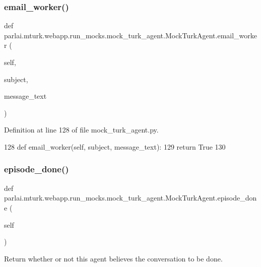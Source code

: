 \subsubsection{\texorpdfstring{email\+\_\+worker()}{email\_worker()}}
{\footnotesize\ttfamily def parlai.\+mturk.\+webapp.\+run\+\_\+mocks.\+mock\+\_\+turk\+\_\+agent.\+Mock\+Turk\+Agent.\+email\+\_\+worker (\begin{DoxyParamCaption}\item[{}]{self,  }\item[{}]{subject,  }\item[{}]{message\+\_\+text }\end{DoxyParamCaption})}



Definition at line 128 of file mock\+\_\+turk\+\_\+agent.\+py.


\begin{DoxyCode}
128     \textcolor{keyword}{def }email\_worker(self, subject, message\_text):
129         \textcolor{keywordflow}{return} \textcolor{keyword}{True}
130 
\end{DoxyCode}
\mbox{\label{classparlai_1_1mturk_1_1webapp_1_1run__mocks_1_1mock__turk__agent_1_1MockTurkAgent_a67dd7773ade58384298eb60b2621350b}} 
\subsubsection{\texorpdfstring{episode\+\_\+done()}{episode\_done()}}
{\footnotesize\ttfamily def parlai.\+mturk.\+webapp.\+run\+\_\+mocks.\+mock\+\_\+turk\+\_\+agent.\+Mock\+Turk\+Agent.\+episode\+\_\+done (\begin{DoxyParamCaption}\item[{}]{self }\end{DoxyParamCaption})}

\begin{DoxyVerb}Return whether or not this agent believes the conversation to be done.
\end{DoxyVerb}
 

